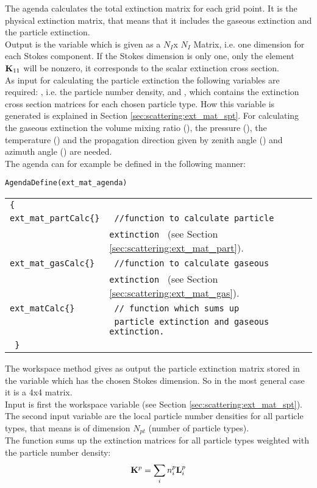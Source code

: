 The agenda  calculates the total extinction
matrix \ExtMat{}
for each grid point. It is the physical extinction matrix, that means
that it includes the gaseous extinction and the particle
extinction.\\
Output is the variable  which is given
as a $N_I$x $N_I$ Matrix, i.e. one dimension for each Stokes component. If the
Stokes dimension is only one, only the element ${\bf K}_{11}$ will be
nonzero, it corresponds to the scalar extinction cross section. \\
As input for calculating the particle extinction the following
variables are required:
, i.e. the particle number density, and 
, which contains the extinction cross section
matrices for each chosen particle type. How this variable is generated
is explained in Section \ref{sec:scattering:ext_mat_spt}. For calculating the
gaseous extinction the volume mixing ratio (), the
pressure  (), the temperature  () and the
propagation direction given by zenith angle () and
azimuth angle () are needed.\\
The agenda can for example be defined in the following manner:

\verb|AgendaDefine(ext_mat_agenda)|\\
\begin{tabular}[h]{l l}
\verb|{ |\\
\verb|ext_mat_partCalc{}| & \verb| //function to calculate particle |\\
& \verb|extinction | (see Section \ref{sec:scattering:ext_mat_part}).\\
\verb|ext_mat_gasCalc{}| & \verb| //function to calculate gaseous | \\
& \verb|extinction | (see Section \ref{sec:scattering:ext_mat_gas}).\\ 
\verb|ext_matCalc{}| &\verb| // function which sums up | \\
& \verb| particle extinction and gaseous extinction.|\\
\verb| }|
\end{tabular}

\label{sec:scattering:ext_mat_part}

The workspace method  gives as output the
particle extinction matrix  stored in the variable
 which has the chosen Stokes dimension. So in
the most general case it is a 4x4 matrix.\\
Input is first the workspace variable  (see Section
\ref{sec:scattering:ext_mat_spt}). The second input variable are the
local particle number densities  for all particle types,
that means  is of dimension $N_{pt}$ (number of
particle types). \\
The function sums up the extinction matrices for all particle types
weighted with the particle number density:
\begin{eqnarray}
  {\bf K}^{p} = \sum_i n^p_i {\bf L}^{p}_i 
\end{eqnarray}


